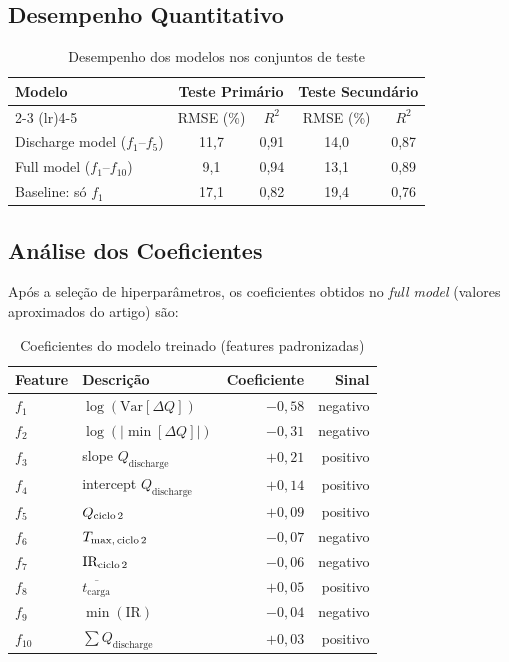 \documentclass[12pt,a4paper]{article}
\begin{document}
\subsection{Desempenho Quantitativo}

\begin{table}[H]
\centering
\caption{Desempenho dos modelos nos conjuntos de teste}
\begin{tabular}{@{}lcccc@{}}
\toprule
\multirow{2}{*}{\textbf{Modelo}} &
\multicolumn{2}{c}{\textbf{Teste Prim\'{a}rio}} &
\multicolumn{2}{c}{\textbf{Teste Secund\'{a}rio}} \\
\cmidrule(lr){2-3} \cmidrule(lr){4-5}
& RMSE (\%) & $R^2$ & RMSE (\%) & $R^2$ \\
\midrule
Discharge model ($f_1$--$f_5$) & 11,7 & 0,91 & 14,0 & 0,87 \\
Full model ($f_1$--$f_{10}$)    &  9,1 & 0,94 & 13,1 & 0,89 \\
Baseline: s\'{o} $f_1$           & 17,1 & 0,82 & 19,4 & 0,76 \\
\bottomrule
\end{tabular}
\end{table}

\subsection{An\'{a}lise dos Coeficientes}

Ap\'{o}s a sele\c{c}\~ao de hiperpar\^{a}metros, os coeficientes obtidos no
\textit{full model} (valores aproximados do artigo) s\~ao:

\begin{table}[H]
\centering
\caption{Coeficientes do modelo treinado (features padronizadas)}
\begin{tabular}{@{}llrr@{}}
\toprule
\textbf{Feature} & \textbf{Descri\c{c}\~ao} & \textbf{Coeficiente} & \textbf{Sinal} \\
\midrule
$f_1$ & $\log(\text{Var}[\Delta Q])$    & $-0{,}58$ & negativo \\
$f_2$ & $\log(|\min[\Delta Q]|)$         & $-0{,}31$ & negativo \\
$f_3$ & slope $Q_{\text{discharge}}$    & $+0{,}21$ & positivo \\
$f_4$ & intercept $Q_{\text{discharge}}$ & $+0{,}14$ & positivo \\
$f_5$ & $Q_{\text{ciclo\,2}}$           & $+0{,}09$ & positivo \\
$f_6$ & $T_{\max,\,\text{ciclo\,2}}$    & $-0{,}07$ & negativo \\
$f_7$ & $\text{IR}_{\text{ciclo\,2}}$   & $-0{,}06$ & negativo \\
$f_8$ & $\overline{t_{\text{carga}}}$   & $+0{,}05$ & positivo \\
$f_9$ & $\min(\text{IR})$               & $-0{,}04$ & negativo \\
$f_{10}$ & $\sum Q_{\text{discharge}}$  & $+0{,}03$ & positivo \\
\bottomrule
\end{tabular}
\end{table}
\end{document}
